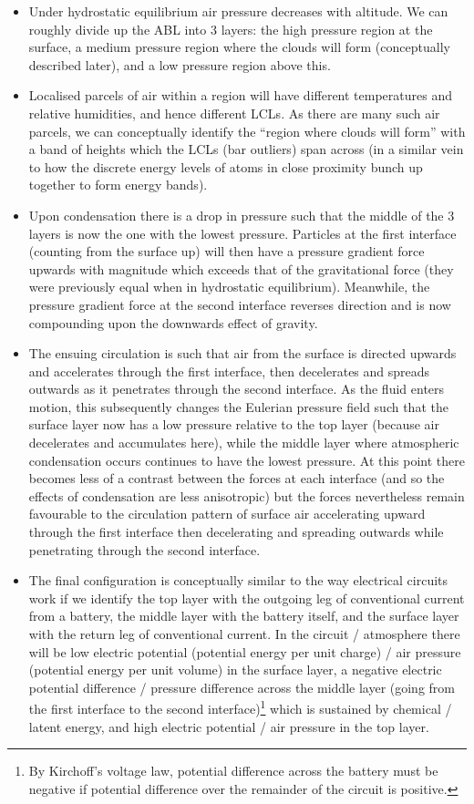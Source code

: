 \begin{itemize}
	\item Under hydrostatic equilibrium air pressure decreases with altitude. We can roughly divide up the ABL into 3 layers: the high pressure region at the surface, a medium pressure region where the clouds will form (conceptually described later), and a low pressure region above this. 
	\item Localised parcels of air within a region will have different temperatures and relative humidities, and hence different LCLs. As there are many such air parcels, we can conceptually identify the “region where clouds will form” with a band of heights which the LCLs (bar outliers) span across (in a similar vein to how the discrete energy levels of atoms in close proximity bunch up together to form energy bands).
	\item Upon condensation there is a drop in pressure such that the middle of the 3 layers is now the one with the lowest pressure. Particles at the first interface (counting from the surface up) will then have a pressure gradient force upwards with magnitude which exceeds that of the gravitational force (they were previously equal when in hydrostatic equilibrium). Meanwhile, the pressure gradient force at the second interface reverses direction and is now compounding upon the downwards effect of gravity. 
	\item The ensuing circulation is such that air from the surface is directed upwards and accelerates through the first interface, then decelerates and spreads outwards as it penetrates through the second interface. As the fluid enters motion, this subsequently changes the Eulerian pressure field such that the surface layer now has a low pressure relative to the top layer (because air decelerates and accumulates here), while the middle layer where atmospheric condensation occurs continues to have the lowest pressure. At this point there becomes less of a contrast between the forces at each interface (and so the effects of condensation are less anisotropic) but the forces nevertheless remain favourable to the circulation pattern of surface air accelerating upward through the first interface then decelerating and spreading outwards while penetrating through the second interface.
	\item The final configuration is conceptually similar to the way electrical circuits work if we identify the top layer with the outgoing leg of conventional current from a battery, the middle layer with the battery itself, and the surface layer with the return leg of conventional current. In the circuit / atmosphere there will be low electric potential (potential energy per unit charge) / air pressure (potential energy per unit volume) in the surface layer, a negative electric potential difference / pressure difference across the middle layer (going from the first interface to the second interface)\footnote{By Kirchoff’s voltage law, potential difference across the battery must be negative if potential difference over the remainder of the circuit is positive.} which is sustained by chemical / latent energy, and high electric potential / air pressure in the top layer.

\end{itemize}
